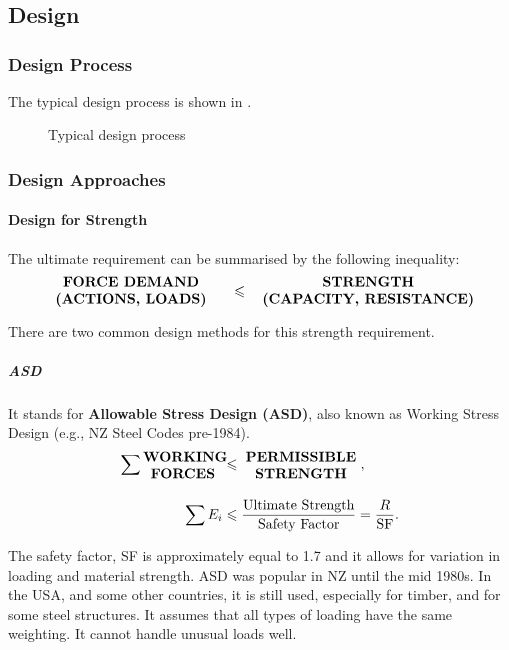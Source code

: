 \part{}
\chapter{Design}
\section{Design Process}
The typical design process is shown in .
\begin{figure}[p]
\centering

\caption{Typical design process}\label{fig:design_flow}
\end{figure}
\section{Design Approaches}
\subsection{Design for Strength}
The ultimate requirement can be summarised by the following inequality:
\begin{gather}
\parbox{5cm}{\bfseries\centering{}FORCE DEMAND\\(ACTIONS, LOADS)}\leqslant\parbox{6cm}{\bfseries\centering{}STRENGTH\\(CAPACITY, RESISTANCE)}
\end{gather}

There are two common design methods for this strength requirement.
\subsubsection{ASD}
It stands for \textbf{Allowable Stress Design (ASD)}, also known as Working Stress Design (e.g., NZ Steel Codes pre-1984).
\begin{align*}
\sum\parbox{2cm}{\bfseries\centering{}WORKING\\FORCES}&\leqslant\parbox{3cm}{\bfseries\centering{}PERMISSIBLE\\STRENGTH},\\[4mm]
\sum{}E_i&\leqslant\dfrac{\text{Ultimate Strength}}{\text{Safety Factor}}=\dfrac{R}{\text{SF}}.
\end{align*}

The safety factor, SF is approximately equal to \num{1.7} and it allows for variation in loading and material strength.
ASD was popular in NZ until the mid 1980s.
In the USA, and some other countries, it is still used, especially for timber, and for some steel structures.
It assumes that all types of loading have the same weighting.
It cannot handle unusual loads well.
